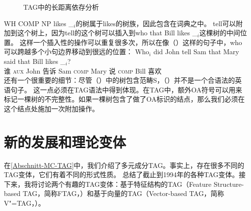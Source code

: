 \begin{figure}
\caption{\label{abb-nld-TAG}TAG中的长距离依存分析}
\end{figure}%
WH COMP NP likes \_$_i$的树属于likes的树族，因此包含在词典之中。
tell可以附加到这个树上，因为tell的这个树可以插入到who that Bill likes \_$_i$这棵树的中间位置。
这样一个插入性的操作可以重复很多次，所以在像（）这样的句子中，who可以跨越多个小句边界移动到很远的位置：
\ea 
\gll Who$_i$ did John tell Sam that Mary said that Bill likes \_$_i$?\\
     谁      \textsc{aux} John 告诉 Sam \textsc{comp} Mary 说 \textsc{comp} Bill 喜欢\\
\z
%
还有一个很重要的细节：尽管（）中的树包含范畴S，（）并不是一个合语法的英语句子。
\z
这一点必须在TAG语法中得到体现。在TAG中，额外OA符号可以用来标记一棵树的不完整性。如果一棵树包含了做了OA标识的结点，那么我们必须在这个结点处施加一次附加操作。

\section{新的发展和理论变体}

在\ref{Abschnitt-MC-TAG}中，我们介绍了多元成分TAG。事实上，存在很多不同的TAG变体，它们有着不同的形式性质。
 \citet[\page]{Rambow94a}总结了截止到1994年的各种TAG变体。接下来，我将讨论两个有趣的TAG变体：基于特征结构的TAG（Feature Structure-based TAG，简称FTAG\indexftagc，\citealp{VSJ88a}）和基于向量的TAG（Vector-based TAG，简称V"=TAG，\citealp{Rambow94a}）。

